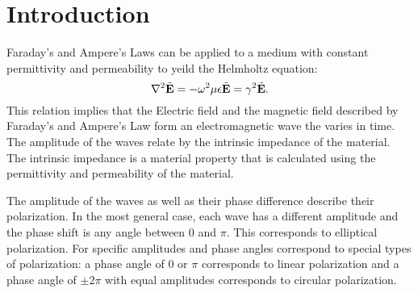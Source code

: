 \section{Introduction}\label{sec:intro}
Faraday's and Ampere's Laws can be applied \cite[pp. 15-16]{lab-manual} to a medium with constant permittivity and permeability to yeild the Helmholtz equation:
\begin{equation}
	\nabla^2 \tilde{\mathbf{E}} = - \omega^2 \mu \epsilon \tilde{\mathbf{E}} = \gamma^2 \tilde{\mathbf{E}}.
\end{equation}
This relation implies that the Electric field and the magnetic field described by Faraday's and Ampere's Law form an electromagnetic wave the varies in time.
The amplitude of the waves relate by the intrinsic impedance of the material.
The intrinsic impedance is a material property that is calculated using the permittivity and permeability of the material. 

The amplitude of the waves as well as their phase difference describe their polarization.
In the most general case, each wave has a different amplitude and the phase shift is any angle between 0 and $\pi$.
This corresponds to elliptical polarization.
For specific amplitudes and phase angles correspond to special types of polarization: a phase angle of 0 or $\pi$ corresponds to linear polarization and a phase angle of $\pm 2\pi$ with equal amplitudes corresponds to circular polarization. 
